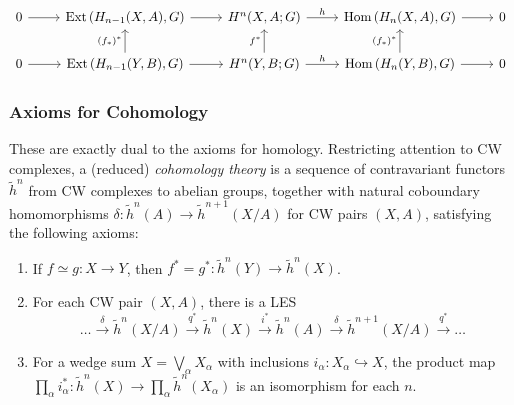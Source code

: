 \documentclass[reqno]{amsart}
\theoremstyle{definition}
\theoremstyle{remark}
\DeclareMathOperator{\Hom}{Hom}
\DeclareMathOperator{\Ext}{Ext}
\begin{document}
     \begin{equation*}
     \begin{tikzcd}
         0 \ar[r] & \Ext \left( H_{n-1}(X,A),G \right) 
         \ar[r] & H^{n}(X,A;G) \ar[r, "h"] &
         \Hom \left( H_n(X,A),G \right) \ar[r] & 0\\
         0 \ar[r] & \Ext \left( H_{n-1}(Y,B),G \right) 
         \ar[r] \ar[u, "(f_*)^{*}"] & 
         H^{n}(Y,B;G) \ar[r, "h"] \ar[u, "f^{*}"] &
         \Hom \left( H_n (Y,B),G \right) \ar[r]
         \ar[u, "(f_*)^{*}"] & 0
     \end{tikzcd}
     \end{equation*}


     \subsubsection{Axioms for Cohomology}

     These are exactly dual to the axioms for homology.
     Restricting attention to CW complexes, a
     (reduced) \textit{cohomology theory} is a sequence
     of contravariant functors
     $\tilde{h}^{n}$ from CW complexes to abelian
     groups, together with natural coboundary homomorphisms
     $\delta \colon \tilde{h}^{n}(A) \to 
     \tilde{h}^{n+1}(X /A)$ for CW pairs $(X,A)$, satisfying
     the following axioms:
     \begin{enumerate}
         \item If $f \simeq g \colon
             X \to Y$, then $f^{*} = g^{*}
             \colon \tilde{h}^{n}(Y) \to 
             \tilde{h}^{n}(X)$.
         \item For each CW pair $(X,A)$, there is a LES
             \[
             \ldots \stackrel{\delta}{\to} 
             \tilde{h}^{n}(X /A) \stackrel{q^{*}}{\to} 
             \tilde{h}^{n}(X) \stackrel{i^{*}}{\to} 
             \tilde{h}^{n}(A)
             \stackrel{\delta}{\to} 
             \tilde{h}^{n+1}(X /A) \stackrel{q^{*}}{\to} 
             \ldots
             \] 
         \item For a wedge sum $X = \bigvee_{\alpha} X_{\alpha}$ 
             with inclusions $i_{\alpha} \colon
             X_{\alpha} \hookrightarrow X$, the product
             map $\prod_{\alpha} i_{\alpha}^{*}
             \colon \tilde{h}^{n}(X) \to 
             \prod_{\alpha} \tilde{h}^{n}(X_{\alpha})$ is
             an isomorphism for each $n$.
     \end{enumerate}
     
\end{document}
